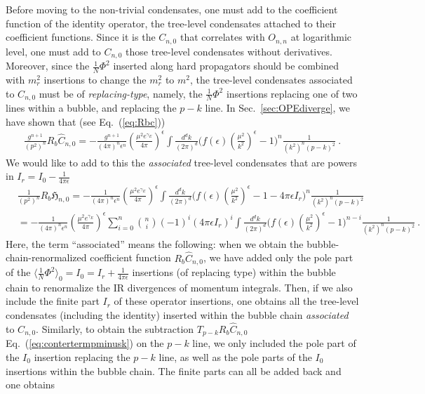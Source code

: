 \documentclass[a4paper,11pt]{article}
\begin{document}
Before moving to the non-trivial condensates, one must add to the coefficient function of the identity operator, the tree-level condensates attached to their coefficient functions. Since it is the $C_{n,0}$ that correlates with $O_{n,n}$ at logarithmic level, one must add to $C_{n,0}$ those tree-level condensates without derivatives. Moreover, since the $\frac{1}{N}\Phi^2$ inserted along hard propagators should be combined with $m_r^2$ insertions to change the $m_r^2$ to $m^2$, the tree-level condensates associated to $C_{n,0}$ must be of {\it replacing-type}, namely, the $\frac{1}{N}\Phi^2$ insertions replacing one of two lines within a bubble, and replacing the $p-k$ line.  In Sec.~\ref{sec:OPEdiverge}, we have shown that (see Eq.~(\ref{eq:Rbc}))
\begin{align}
\frac{g^{n+1}}{(p^2)^n}R_{b}\hat C_{n,0}=-\frac{g^{n+1}}{(4\pi)^n \epsilon^n}\left(\frac{\mu^2 e^{\gamma_E}}{4\pi}\right)^{\epsilon}\int \frac{d^dk}{(2\pi)^d}\bigg(f(\epsilon)\left(\frac{\mu^2}{k^2}\right)^{\epsilon}-1\bigg)^n\frac{1}{(k^2)^n(p-k)^2} \ .
\end{align}
We would like to add to this the {\it associated } tree-level condensates that are powers in $I_r=I_0-\frac{1}{4\pi \epsilon}$
\begin{align}
&\frac{1}{(p^2)^n}R_b\mathfrak{H}_{n,0}=-\frac{1}{(4\pi)^n \epsilon^n}\left(\frac{\mu^2 e^{\gamma_E}}{4\pi}\right)^{\epsilon}\int \frac{d^dk}{(2\pi)^d}\bigg(f(\epsilon)\left(\frac{\mu^2}{k^2}\right)^{\epsilon}-1-4\pi \epsilon I_r\bigg)^n\frac{1}{(k^2)^n(p-k)^2}\nonumber \\ 
&=-\frac{1}{(4\pi)^n\epsilon^n}\left(\frac{\mu^2 e^{\gamma_E}}{4\pi}\right)^{\epsilon}\sum_{i=0}^n\binom{n}{i}(-1)^i(4\pi \epsilon I_r)^i \int \frac{d^dk}{(2\pi)^d}\bigg(f(\epsilon)\left(\frac{\mu^2}{k^2}\right)^{\epsilon}-1\bigg)^{n-i}\frac{1}{(k^2)^n(p-k)^2}  \ . 
\end{align}
Here, the term ``associated'' means the following:
when we obtain the bubble-chain-renormalized coefficient function $R_b\hat C_{n,0}$, we have added only the pole part of the $\langle \frac{1}{N}\Phi^2\rangle_0=I_0=I_r+\frac{1}{4\pi \epsilon}$ insertions (of replacing type) within the bubble chain to renormalize the IR divergences of momentum integrals. Then, if we also include the finite part $I_r$ of these operator insertions, one obtains all the tree-level condensates (including the identity) inserted within the bubble chain {\it associated} to $C_{n,0}$.  Similarly, to obtain the subtraction $T_{p-k}R_b \hat C_{n,0}$ Eq.~(\ref{eq:contertermpminusk}) on the $p-k$ line, we only included the pole part of the $I_0$ insertion replacing the $p-k$ line, as well as the pole parts of the $I_0$ insertions within the bubble chain. The finite parts can all be added back and one obtains
\end{document}
